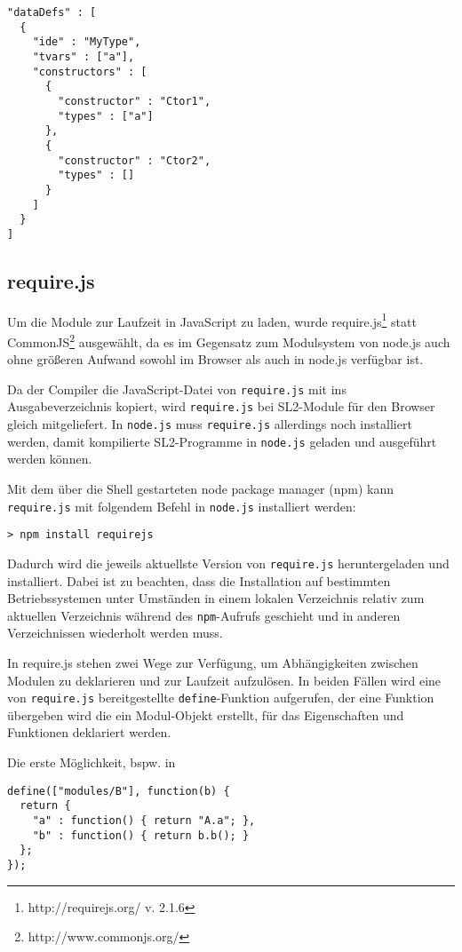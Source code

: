 \documentclass[runningheads]{llncs}
\begin{document}
\begin{verbatim}
"dataDefs" : [
  {
    "ide" : "MyType",
    "tvars" : ["a"],
    "constructors" : [
      {
        "constructor" : "Ctor1",
        "types" : ["a"]
      },
      {
        "constructor" : "Ctor2",
        "types" : []
      }
    ]
  }
]
\end{verbatim}

\subsection{require.js}
\label{sec:compReq}

Um die Module zur Laufzeit in JavaScript zu laden, wurde
require.js\footnote{http://requirejs.org/ v. 2.1.6}
statt CommonJS\footnote{http://www.commonjs.org/} ausgewählt, da es im
Gegensatz zum Modulsystem von node.js auch ohne größeren Aufwand
sowohl im Browser als auch in node.js verfügbar ist.

Da der Compiler die JavaScript-Datei von \texttt{require.js} mit ins
Ausgabeverzeichnis kopiert, wird \texttt{require.js} bei SL2-Module
für den Browser gleich mitgeliefert. In \texttt{node.js} muss
\texttt{require.js} allerdings noch installiert werden, damit
kompilierte SL2-Programme in \texttt{node.js} geladen und ausgeführt
werden können.

Mit dem über die Shell gestarteten node package manager (npm) kann
\texttt{require.js} mit folgendem Befehl in \texttt{node.js}
installiert werden:

\begin{verbatim}
> npm install requirejs
\end{verbatim}

Dadurch wird die jeweils aktuellste Version von \texttt{require.js} heruntergeladen
und installiert. Dabei ist zu beachten, dass die Installation auf
bestimmten Betriebssystemen unter Umständen in einem lokalen Verzeichnis
relativ zum aktuellen Verzeichnis während des \texttt{npm}-Aufrufs
geschieht und in anderen Verzeichnissen wiederholt werden muss.

In require.js stehen zwei Wege zur Verfügung, um Abhängigkeiten zwischen
Modulen zu deklarieren und zur Laufzeit aufzulösen. In beiden Fällen
wird eine von \texttt{require.js} bereitgestellte
\texttt{define}-Funktion aufgerufen, der eine Funktion übergeben wird
die ein Modul-Objekt erstellt, für das Eigenschaften und Funktionen
deklariert werden.

Die erste Möglichkeit, bspw. in

\begin{verbatim}
define(["modules/B"], function(b) {
  return {
    "a" : function() { return "A.a"; },
    "b" : function() { return b.b(); }
  };
});
\end{verbatim}
\end{document}
